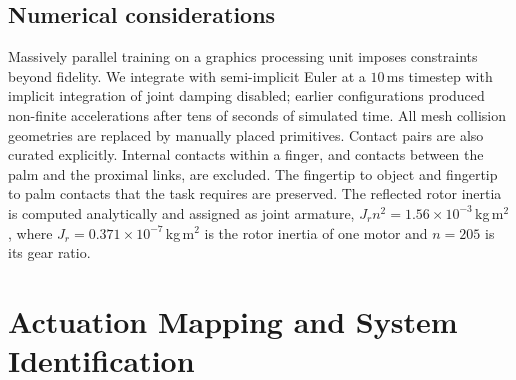 \documentclass[11pt]{article}
\begin{document}
\subsection{Numerical considerations}
Massively parallel training on a graphics processing unit imposes constraints beyond fidelity.
We integrate with semi-implicit Euler at a $10$\,ms timestep with implicit integration of joint damping disabled; earlier configurations produced non-finite accelerations after tens of seconds of simulated time.
All mesh collision geometries are replaced by manually placed primitives.
Contact pairs are also curated explicitly.
Internal contacts within a finger, and contacts between the palm and the proximal links, are excluded.
The fingertip to object and fingertip to palm contacts that the task requires are preserved.
The reflected rotor inertia is computed analytically and assigned as joint armature, $J_r n^2 = 1.56\times10^{-3}$\,kg\,m$^2$, where $J_r = 0.371\times10^{-7}$\,kg\,m$^2$ is the rotor inertia of one motor and $n = 205$ is its gear ratio.

\section{Actuation Mapping and System Identification}
\label{sec:sysid}
\end{document}
